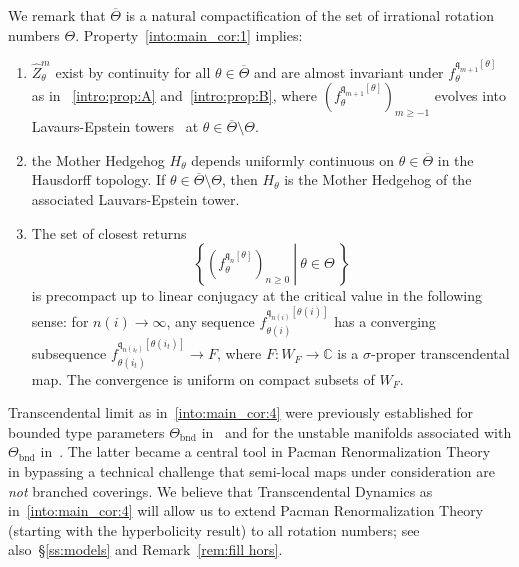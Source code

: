 \documentclass{amsart}
\newcommand{\1}{{\mathbb 1 }}
\newcommand{\wZ}{{\widehat Z}}
\newcommand{\qq}{\mathfrak{q}}
\newcommand{\C}{\mathbb{C}}
\theoremstyle{remark}
\numberwithin{equation}{section}
\theoremstyle{definition}
\newcommand{\bnd}{{\mathrm{bnd}}}
\newcommand{\ovlTheta}{{\overline \Theta}}
\begin{document}
\noindent We remark that $\ovlTheta$ is a natural compactification of the set of irrational rotation numbers $\Theta$.  Property~\ref{into:main_cor:1} implies:
 \begin{enumerate}[label=\text{(\Roman*)},font=\normalfont,leftmargin=*,start=2]
\item \label{into:main_cor:2} $\wZ^m_\theta$ exist  by continuity for all $\theta\in \ovlTheta$ and are almost invariant under $f^{\qq_{m+1}[\theta]}_\theta$ as in ~\ref{intro:prop:A} and~\ref{intro:prop:B}, where  $\left(f^{\qq_{m+1}[\theta]}_\theta\right)_{m\ge -1}$ evolves into Lavaurs-Epstein towers~\cite{La,Ep} at $\theta\in \ovlTheta\setminus \Theta$.
\item \label{into:main_cor:3} the Mother Hedgehog $H_{\theta}$ depends uniformly continuous on $\theta\in \ovlTheta$ in the Hausdorff topology. If $\theta\in \ovlTheta\setminus \Theta$, then $H_\theta$ is the Mother Hedgehog of the associated Lauvars-Epstein tower.
\item \label{into:main_cor:4}The set of closest returns \[
 \left\{\left.\left(f_\theta^{\qq_n[\theta]}\right)_{n\ge 0}\ \right| \ \theta\in \Theta \  \right\} \] is precompact up to linear conjugacy at the critical value in the following sense: for $n(i)\to  \infty$, any sequence $f^{\qq_{n(i)}[\theta(i)]}_{\theta(i)}$ has a converging subsequence $f^{\qq_{n(i_t)}[\theta(i_t)]}_{\theta(i_t)}\to F$, where $F\colon W_F\to \C$ is a $\sigma$-proper transcendental map. The convergence is uniform on compact subsets of $W_F$.
\end{enumerate} 
\noindent Transcendental limit as in~\ref{into:main_cor:4} were previously established for bounded type parameters $\Theta_\bnd$ in~\cite[Theorem~8.1]{McM1} and for the unstable manifolds associated with $\Theta_\bnd$ in~\cite[Theorem 5.1]{DLS}. The latter became a central tool in Pacman Renormalization Theory~\cite{DLS,DL}  in bypassing a technical challenge that semi-local maps under consideration are \emph{not} branched coverings. We believe that Transcendental Dynamics as in~\ref{into:main_cor:4} will allow us to extend Pacman Renormalization Theory (starting with the hyperbolicity result) to all rotation numbers; see also~\S\ref{ss:models} and Remark~\ref{rem:fill hors}.
\end{document}
